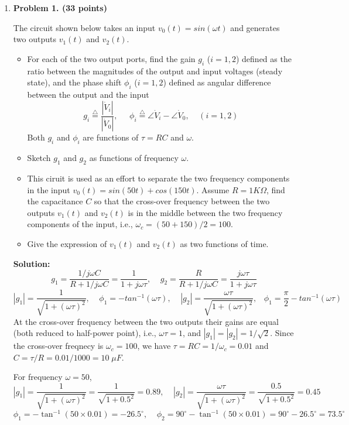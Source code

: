 \begin{enumerate}

\item {\bf Problem 1. (33 points)} 

The circuit shown below takes an input $v_0(t)=sin(\omega t)$ and generates 
two outputs $v_1(t)$ and $v_2(t)$. 


\begin{itemize}
\item For each of the two output ports, find the gain $g_i$ ($i=1,2$) 
defined as the ratio between the magnitudes of the output and input 
voltages (steady state), and the phase shift $\phi_i$ ($i=1,2$) defined
as angular difference between the output and the input
\[ g_i\stackrel{\triangle}{=}\frac{|\dot{V}_i|}{|\dot{V}_0|},\;\;\;\;\;
\phi_i\stackrel{\triangle}{=}\angle \dot{V}_i-\angle \dot{V}_0,\;\;\;\;
(i=1,2) \]
Both $g_i$ and $\phi_i$ are functions of $\tau=RC$ and $\omega$.

\item Sketch $g_1$ and $g_2$ as functions of frequency $\omega$.

\item This ciruit is used as an effort to separate the two frequency components 
in the input $v_0(t)=sin(50 t)+cos(150 t)$. Assume $R=1K\Omega$, find the 
capacitance $C$ so that the cross-over frequency between the two outputs 
$v_1(t)$ and $v_2(t)$ is in the middle between the two frequency components
of the input, i.e., $\omega_c=(50+150)/2=100$.

\item Give the expression of $v_1(t)$ and $v_2(t)$ as two functions of time.

\end{itemize}

{\bf Solution:} 
\[	g_1=\frac{1/j\omega C}{R+1/j\omega C}=\frac{1}{1+j\omega \tau},\;\;\;\;
g_2=\frac{R}{R+1/j\omega C}=\frac{j\omega \tau}{1+j\omega \tau} \]
\[	|g_1|=\frac{1}{\sqrt{1+(\omega \tau)^2}},\;\;\;\;
	\phi_1=-tan^{-1}(\omega \tau),\;\;\;\;
	|g_2|=\frac{\omega \tau}{\sqrt{1+(\omega \tau)^2}},\;\;\;
	\phi_1=\frac{\pi}{2}-tan^{-1}(\omega \tau) \]
At the cross-over frequency between the two outputs their gains are equal 
(both reduced to half-power point), i.e., $\omega \tau=1$, and 
$|g_1|=|g_2|=1/\sqrt{2}$. Since the cross-over freqnecy is $\omega_c=100$,
we have $\tau=RC=1/\omega_c=0.01$ and $C=\tau/R=0.01/1000=10\;\mu F$.

For frequency $\omega=50$, 
\[ |g_1|=\frac{1}{\sqrt{1+(\omega \tau)^2}}=\frac{1}{\sqrt{1+0.5^2}}=0.89,\;\;\;\;
|g_2|=\frac{\omega \tau}{\sqrt{1+(\omega \tau)^2}}=\frac{0.5}{\sqrt{1+0.5^2}}=0.45 \]
\[ \phi_1=-\tan^{-1}(50\times 0.01)=-26.5^\circ,\;\;\;\;
   \phi_2=90^\circ-\tan^{-1}(50\times 0.01)=90^\circ-26.5^\circ=73.5^\circ \]


\end{enumerate}
